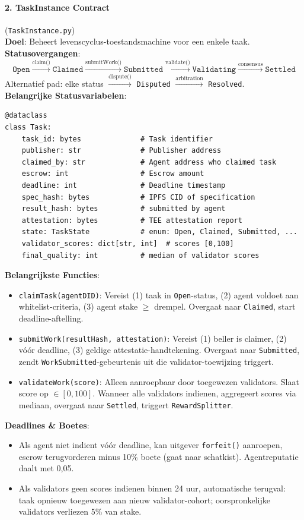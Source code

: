 \documentclass[11pt]{article}
\begin{document}
\paragraph{2. TaskInstance Contract} (\texttt{TaskInstance.py})\\
\textbf{Doel}: Beheert levenscyclus-toestandsmachine voor een enkele taak.\\
\textbf{Statusovergangen}:
\begin{equation}
\texttt{Open} \xrightarrow{\text{claim()}} \texttt{Claimed} \xrightarrow{\text{submitWork()}} \texttt{Submitted} \xrightarrow{\text{validate()}} \texttt{Validating} \xrightarrow{\text{consensus}} \texttt{Settled}
\end{equation}
Alternatief pad: elke status $\xrightarrow{\text{dispute()}}$ \texttt{Disputed} $\xrightarrow{\text{arbitration}}$ \texttt{Resolved}.\\
\textbf{Belangrijke Statusvariabelen}:
\begin{verbatim}
@dataclass
class Task:
    task_id: bytes              # Task identifier
    publisher: str              # Publisher address
    claimed_by: str             # Agent address who claimed task
    escrow: int                 # Escrow amount
    deadline: int               # Deadline timestamp
    spec_hash: bytes            # IPFS CID of specification
    result_hash: bytes          # submitted by agent
    attestation: bytes          # TEE attestation report
    state: TaskState            # enum: Open, Claimed, Submitted, ...
    validator_scores: dict[str, int]  # scores [0,100]
    final_quality: int          # median of validator scores
\end{verbatim}
\textbf{Belangrijkste Functies}:
\begin{itemize}[noitemsep]
  \item \texttt{claimTask(agentDID)}: Vereist (1) taak in \texttt{Open}-status, (2) agent voldoet aan whitelist-criteria, (3) agent stake $\geq$ drempel. Overgaat naar \texttt{Claimed}, start deadline-aftelling.
  \item \texttt{submitWork(resultHash, attestation)}: Vereist (1) beller is claimer, (2) vóór deadline, (3) geldige attestatie-handtekening. Overgaat naar \texttt{Submitted}, zendt \texttt{WorkSubmitted}-gebeurtenis uit die validator-toewijzing triggert.
  \item \texttt{validateWork(score)}: Alleen aanroepbaar door toegewezen validators. Slaat score op $\in [0,100]$. Wanneer alle validators indienen, aggregeert scores via mediaan, overgaat naar \texttt{Settled}, triggert \texttt{RewardSplitter}.
\end{itemize}
\textbf{Deadlines \& Boetes}:
\begin{itemize}[noitemsep]
  \item Als agent niet indient vóór deadline, kan uitgever \texttt{forfeit()} aanroepen, escrow terugvorderen minus 10\% boete (gaat naar schatkist). Agentreputatie daalt met 0,05.
  \item Als validators geen scores indienen binnen 24 uur, automatische terugval: taak opnieuw toegewezen aan nieuw validator-cohort; oorspronkelijke validators verliezen 5\% van stake.
\end{itemize}
\end{document}
